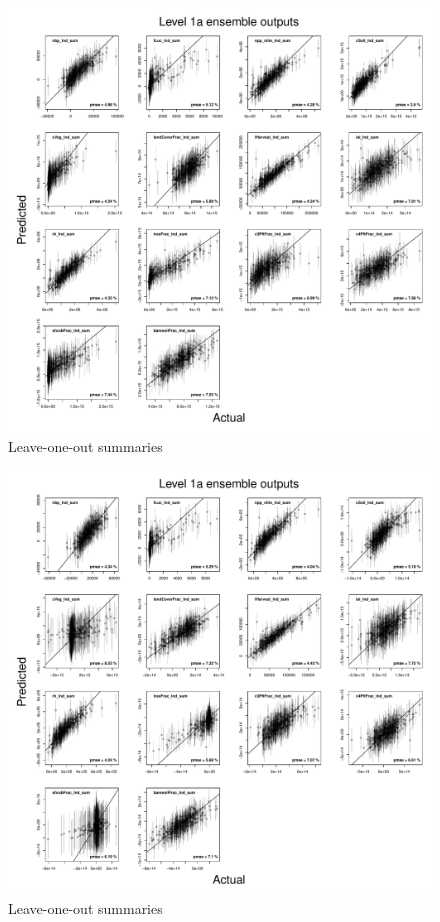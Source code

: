 \documentclass[gmd, manuscript]{copernicus}
\begin{document}
%
\begin{figure}[t]
\includegraphics[width=12cm]{./graphics/kmloostats_Y_level1a.pdf}
\caption{Leave-one-out summaries }
\label{fig:kmloostats_Y_level1a}
\end{figure}


%
\begin{figure}[t]
\includegraphics[width=12cm]{./graphics/kmloostats_YAnom_level1a.pdf}
\caption{Leave-one-out summaries }
\label{fig:kmloostats_YAnom_level1a}
\end{figure}
\end{document}

